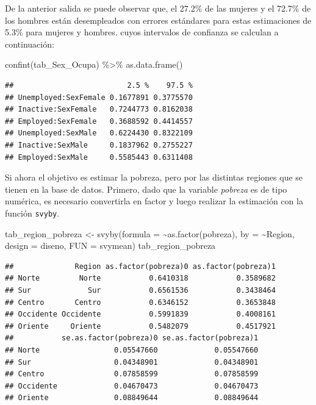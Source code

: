 \documentclass[
  12pt,
]{book}
\newenvironment{Shaded}{\begin{snugshade}}{\end{snugshade}}
\newcommand{\AttributeTok}[1]{\textcolor[rgb]{0.77,0.63,0.00}{#1}}
\newcommand{\FunctionTok}[1]{\textcolor[rgb]{0.00,0.00,0.00}{#1}}
\newcommand{\NormalTok}[1]{#1}
\newcommand{\OtherTok}[1]{\textcolor[rgb]{0.56,0.35,0.01}{#1}}
\newcommand{\SpecialCharTok}[1]{\textcolor[rgb]{0.00,0.00,0.00}{#1}}
\begin{document}
De la anterior salida se puede observar que, el 27.2\% de las mujeres y el 72.7\% de los hombres están desempleados con errores estándares para estas estimaciones de 5.3\% para mujeres y hombres. cuyos intervalos de confianza se calculan a continuación:

\begin{Shaded}
\begin{Highlighting}[]
\FunctionTok{confint}\NormalTok{(tab\_Sex\_Ocupa) }\SpecialCharTok{\%\textgreater{}\%} \FunctionTok{as.data.frame}\NormalTok{()}
\end{Highlighting}
\end{Shaded}

\begin{verbatim}
##                          2.5 %    97.5 %
## Unemployed:SexFemale 0.1677891 0.3775570
## Inactive:SexFemale   0.7244773 0.8162038
## Employed:SexFemale   0.3688592 0.4414557
## Unemployed:SexMale   0.6224430 0.8322109
## Inactive:SexMale     0.1837962 0.2755227
## Employed:SexMale     0.5585443 0.6311408
\end{verbatim}

Si ahora el objetivo es estimar la pobreza, pero por las distintas regiones que se tienen en la base de datos. Primero, dado que la variable \emph{pobreza} es de tipo numérica, es necesario convertirla en factor y luego realizar la estimación con la función \texttt{svyby}.

\begin{Shaded}
\begin{Highlighting}[]
\NormalTok{tab\_region\_pobreza }\OtherTok{\textless{}{-}} \FunctionTok{svyby}\NormalTok{(}\AttributeTok{formula =} \SpecialCharTok{\textasciitilde{}}\FunctionTok{as.factor}\NormalTok{(pobreza),  }\AttributeTok{by =} \SpecialCharTok{\textasciitilde{}}\NormalTok{Region, }
                            \AttributeTok{design =}\NormalTok{  diseno, }\AttributeTok{FUN =}\NormalTok{ svymean)}
\NormalTok{tab\_region\_pobreza}
\end{Highlighting}
\end{Shaded}

\begin{verbatim}
##              Region as.factor(pobreza)0 as.factor(pobreza)1
## Norte         Norte           0.6410318           0.3589682
## Sur             Sur           0.6561536           0.3438464
## Centro       Centro           0.6346152           0.3653848
## Occidente Occidente           0.5991839           0.4008161
## Oriente     Oriente           0.5482079           0.4517921
##           se.as.factor(pobreza)0 se.as.factor(pobreza)1
## Norte                 0.05547660             0.05547660
## Sur                   0.04348901             0.04348901
## Centro                0.07858599             0.07858599
## Occidente             0.04670473             0.04670473
## Oriente               0.08849644             0.08849644
\end{verbatim}
\end{document}

